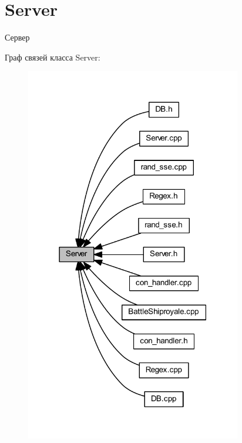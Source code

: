 \hypertarget{group__server}{}\section{Server}
\label{group__server}


Сервер  


Граф связей класса Server\+:\nopagebreak
\begin{figure}[H]
\begin{center}
\leavevmode
\includegraphics[width=267pt]{group__server}
\end{center}
\end{figure}
